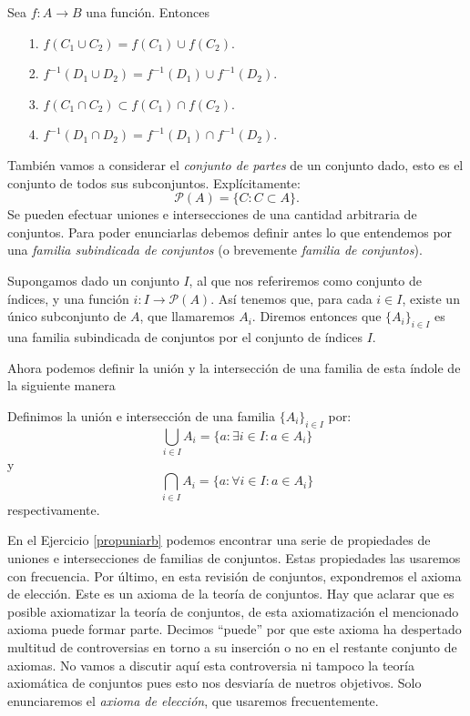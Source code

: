 \begin{proposicion}\label{propfunc} Sea $f:A\longrightarrow B$ una función.
Entonces
\begin{itemize}
\item[1.] $f(C_1\cup C_2)=f(C_1)\cup f(C_2).$
\item[2.]$f^{-1}(D_1\cup D_2)= f^{-1}(D_1)\cup f^{-1}(D_2).$
\item[3.] $f(C_1\cap C_2)\subset f(C_1)\cap f(C_2).$
\item[4.]$f^{-1}(D_1\cap D_2)= f^{-1}(D_1)\cap f^{-1}(D_2).$
\end{itemize}
\end{proposicion}


También vamos a considerar el \emph{conjunto de partes} de un conjunto
dado, esto es el conjunto de todos sus subconjuntos.
Explícitamente:
\[\mathcal{P}(A)=\{C:C\subset A\}.\]
Se pueden efectuar uniones e intersecciones de una cantidad
arbitraria de conjuntos. Para poder enunciarlas debemos definir
antes lo que entendemos por una \emph{familia subindicada de
conjuntos} (o brevemente \emph{familia de conjuntos}).

\begin{definicion} Supongamos dado un conjunto $I$, al que nos referiremos como
conjunto de índices, y una función $i:I\longrightarrow
\mathcal{P}(A)$. Así tenemos que, para cada $i\in I$, existe
un único subconjunto de $A$, que llamaremos $A_i$. Diremos entonces que $\{A_i\}_{i\in I}$ es una familia
subindicada de conjuntos por el conjunto de índices $I$.
\end{definicion}

Ahora podemos definir la unión y la intersección de una
familia de esta índole de la siguiente manera
\begin{definicion} Definimos la unión e intersección de una
familia $\{A_i\}_{i\in I}$ por:
\[\bigcup_{i\in I}A_i=\{a:\exists i\in I:a\in A_i\}\]
y
\[\bigcap_{i\in I}A_i=\{a:\forall i\in I:a\in A_i\}\]
respectivamente.
\end{definicion}
En el Ejercicio \vref{propuniarb} podemos encontrar una serie de
propiedades de uniones e intersecciones de familias de conjuntos.
Estas propiedades las usaremos con frecuencia.
 Por último, en esta revisión de conjuntos, expondremos el
 axioma de elección. Este es un axioma de la teoría de
 conjuntos. Hay que aclarar que es posible axiomatizar la
 teoría de conjuntos, de esta axiomatización el mencionado axioma
 puede formar parte. Decimos ``puede'' por que este
 axioma ha despertado multitud de controversias en torno a su
 inserción o no en el restante conjunto de axiomas. No vamos a
 discutir aquí esta controversia ni tampoco la teoría
 axiomática de conjuntos pues esto nos desviaría de nuetros
 objetivos. Solo enunciaremos el \emph{axioma de elección}, que
 usaremos frecuentemente.

